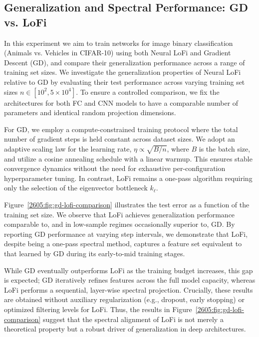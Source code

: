 \subsection{Generalization and Spectral Performance: GD vs. LoFi} 
\label{2605:app:gd-spectral-performance-comp}
In this experiment we aim to train networks for image binary classification (Animals vs. Vehicles in CIFAR-10) using both Neural LoFi and Gradient Descent (GD), and compare their generalization performance across a range of training set sizes. 
We investigate the generalization properties of Neural LoFi relative to GD by evaluating their test performance across varying training set sizes $n \in [10^2, 5 \times 10^4]$. To ensure a controlled comparison, we fix the architectures for both FC and CNN models to have a comparable number of parameters and identical random projection dimensions.


For GD, we employ a compute-constrained training protocol where the total number of gradient steps is held constant across dataset sizes. We adopt an adaptive scaling law for the learning rate, $\eta \propto \sqrt{B/n}$, where $B$ is the batch size, and utilize a cosine annealing schedule with a linear warmup. This ensures stable convergence dynamics without the need for exhaustive per-configuration hyperparameter tuning. In contrast, LoFi remains a one-pass algorithm requiring only the selection of the eigenvector bottleneck $k_\ell$.

Figure~\ref{2605:fig:gd-lofi-comparison} illustrates the test error as a function of the training set size. We observe that LoFi achieves generalization performance comparable to, and in low-sample regimes occasionally superior to, GD. By reporting GD performance at varying step intervals, we demonstrate that LoFi, despite being a one-pass spectral method, captures a feature set equivalent to that learned by GD during its early-to-mid training stages. 

While GD eventually outperforms LoFi as the training budget increases, this gap is expected; GD iteratively refines features across the full model capacity, whereas LoFi performs a sequential, layer-wise spectral projection. Crucially, these results are obtained without auxiliary regularization (e.g., dropout, early stopping) or optimized filtering levels for LoFi. Thus, the results in Figure~\ref{2605:fig:gd-lofi-comparison} suggest that the spectral alignment of LoFi is not merely a theoretical property but a robust driver of generalization in deep architectures.

